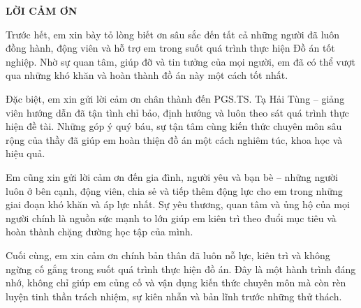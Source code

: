 \documentclass[../DoAn.tex]{subfiles}
\begin{document}
\begin{center}
    \Large{\textbf{LỜI CẢM ƠN}}\\
\end{center}
\vspace{1cm}
Trước hết, em xin bày tỏ lòng biết ơn sâu sắc đến tất cả những người đã luôn đồng hành, động viên và hỗ trợ em trong suốt quá trình thực hiện Đồ án tốt nghiệp. Nhờ sự quan tâm, giúp đỡ và tin tưởng của mọi người, em đã có thể vượt qua những khó khăn và hoàn thành đồ án này một cách tốt nhất.

Đặc biệt, em xin gửi lời cảm ơn chân thành đến PGS.TS. Tạ Hải Tùng – giảng viên hướng dẫn đã tận tình chỉ bảo, định hướng và luôn theo sát quá trình thực hiện đề tài. Những góp ý quý báu, sự tận tâm cùng kiến thức chuyên môn sâu rộng của thầy đã giúp em hoàn thiện đồ án một cách nghiêm túc, khoa học và hiệu quả.

Em cũng xin gửi lời cảm ơn đến gia đình, người yêu và bạn bè – những người luôn ở bên cạnh, động viên, chia sẻ và tiếp thêm động lực cho em trong những giai đoạn khó khăn và áp lực nhất. Sự yêu thương, quan tâm và ủng hộ của mọi người chính là nguồn sức mạnh to lớn giúp em kiên trì theo đuổi mục tiêu và hoàn thành chặng đường học tập của mình.

Cuối cùng, em xin cảm ơn chính bản thân đã luôn nỗ lực, kiên trì và không ngừng cố gắng trong suốt quá trình thực hiện đồ án. Đây là một hành trình đáng nhớ, không chỉ giúp em củng cố và vận dụng kiến thức chuyên môn mà còn rèn luyện tinh thần trách nhiệm, sự kiên nhẫn và bản lĩnh trước những thử thách.
\end{document}
